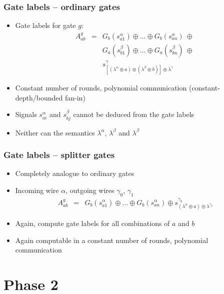 \documentclass{beamer}
\begin{document}
\begin{frame}
  \frametitle{Gate labels -- ordinary gates}
  \begin{itemize}
  \item Gate labels for gate $g$:
    \begin{eqnarray*}
      A_{ab}^g &= & G_b(s_{a1}^\alpha)\oplus\dots\oplus G_b(s_{an}^\alpha) 
      \ \oplus \  \\ \nonumber
      & & G_a(s_{b1}^\beta)\oplus\dots\oplus G_a(s_{bn}^\beta)
      \ \oplus \ \\ \nonumber
      & & s_{[(\lambda^\alpha\oplus a)\otimes(\lambda^\beta\oplus b)]\oplus\lambda^\gamma}^\gamma
    \end{eqnarray*}
  \item Constant number of rounds, polynomial communication (constant-depth/bounded fan-in)
  \item %
    Signals $s_{ai}^\alpha$ and $s_{bj}^\beta$ cannot be deduced from the gate labels
  \item Neither can the semantics $\lambda^\alpha$, $\lambda^\beta$ and $\lambda^\beta$
  \end{itemize}
\end{frame}

\begin{frame}
  \frametitle{Gate labels -- splitter gates}
  \begin{itemize}
  \item Completely analogue to ordinary gates
  \item Incoming wire $\alpha$, outgoing wires $\gamma_0$, $\gamma_1$
    \begin{eqnarray*}
      A_{ab}^g & = & G_b(s^\alpha_{a1}) \oplus \dots \oplus G_b(s^\alpha_{an}) \oplus s^{\gamma_b}_{(\lambda^\alpha\oplus a)\oplus\lambda^{\gamma_b}}
    \end{eqnarray*}
  \item Again, compute gate labels for all combinations of $a$ and $b$
  \item Again computable in a constant number of rounds, polynomial communication
  \end{itemize}
\end{frame}

\section{Phase 2}
\label{sec:phase-2}
\end{document}
